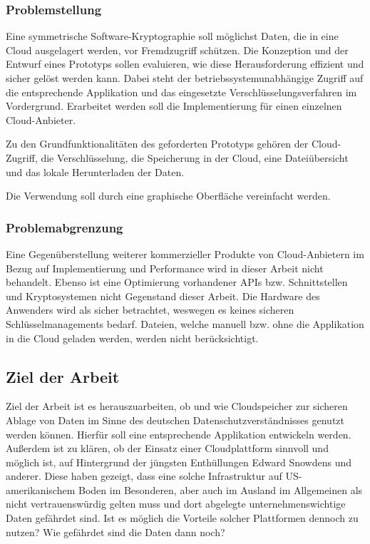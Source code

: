 \documentclass[13pt,a4paper,bibliography=totocnumbered,listof=totocnumbered]{scrartcl}
\begin{document}
\subsubsection{Problemstellung}
Eine symmetrische Software-Kryptographie soll möglichst Daten, die in eine Cloud ausgelagert werden,  vor Fremdzugriff schützen. Die Konzeption und der Entwurf eines Prototyps sollen evaluieren, wie diese Herausforderung effizient und sicher gelöst werden kann. Dabei steht der betriebssystemunabhängige Zugriff auf die entsprechende Applikation und das eingesetzte Verschlüsselungsverfahren im Vordergrund. Erarbeitet werden soll die Implementierung für einen einzelnen Cloud-Anbieter. 

Zu den Grundfunktionalitäten des geforderten Prototyps gehören der Cloud-Zugriff, die Verschlüsselung, die Speicherung in der Cloud, eine Dateiübersicht und das lokale Herunterladen der Daten.

Die Verwendung soll durch eine graphische Oberfläche vereinfacht werden.

\subsubsection{Problemabgrenzung}
Eine Gegenüberstellung weiterer kommerzieller Produkte von Cloud-Anbietern im Bezug auf Implementierung und Performance wird in dieser Arbeit nicht behandelt. Ebenso ist eine Optimierung vorhandener APIs bzw. Schnittstellen und Kryptosystemen nicht Gegenstand dieser Arbeit. Die Hardware des Anwenders wird als sicher betrachtet, weswegen es keines sicheren Schlüsselmanagements bedarf. Dateien, welche manuell bzw. ohne die Applikation in die Cloud geladen werden, werden nicht berücksichtigt.

\subsection{Ziel der Arbeit}
Ziel der Arbeit ist es herauszuarbeiten, ob und wie Cloudspeicher zur sicheren Ablage von Daten im Sinne des deutschen Datenschutzverständnisses genutzt werden können. Hierfür soll eine entsprechende Applikation entwickeln werden. Außerdem ist zu klären, ob der Einsatz einer Cloudplattform sinnvoll und möglich ist, auf Hintergrund der jüngsten Enthüllungen Edward Snowdens und anderer. Diese haben gezeigt, dass eine solche Infrastruktur auf US-amerikanischem Boden im Besonderen, aber auch im Ausland im Allgemeinen als nicht vertrauenswürdig gelten muss und dort abgelegte unternehmenswichtige Daten gefährdet sind. Ist es möglich die Vorteile solcher Plattformen dennoch zu nutzen? Wie gefährdet sind die Daten dann noch?
\end{document}
